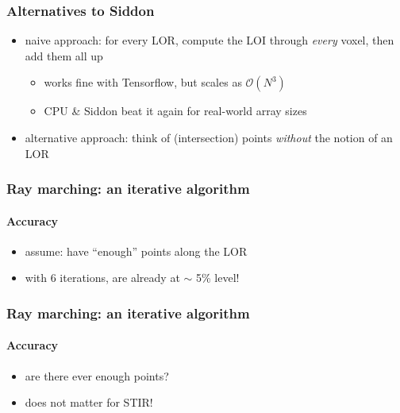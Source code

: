 \documentclass{beamer}
\begin{document}
\begin{frame}
  \frametitle{Alternatives to Siddon}
  \begin{itemize}
    \item naive approach: for every LOR, compute the LOI through \textsl{every} voxel, then add them all up
      \begin{itemize}
        \item works fine with Tensorflow, but scales as $\mathcal{O}(N^3)$
        \item CPU \& Siddon beat it again for real-world array sizes
      \end{itemize}
    \item alternative approach: think of (intersection) points \textsl{without} the notion of an LOR
  \end{itemize}
\end{frame}

\begin{frame}
  \frametitle{Ray marching: an iterative algorithm}
  \framesubtitle{Accuracy}
  \begin{itemize}
    \item assume: have ``enough'' points along the LOR
  \end{itemize}
  \begin{figure}
    \centering
  \end{figure}
  \begin{itemize}
    \item with 6 iterations, are already at $\sim$ 5\% level!
  \end{itemize}
\end{frame}

\begin{frame}
  \frametitle{Ray marching: an iterative algorithm}
  \framesubtitle{Accuracy}
  \begin{itemize}
    \item are there ever enough points?
  \end{itemize}

  \begin{itemize}
    \item does not matter for STIR!
  \end{itemize}
\end{frame}
\end{document}
